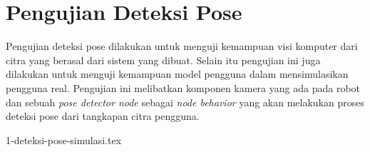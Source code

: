 \section{Pengujian Deteksi Pose}
\label{sec:pengujiandeteksipose}

Pengujian deteksi pose dilakukan untuk menguji kemampuan visi komputer dari citra yang berasal dari sistem yang dibuat.
Selain itu pengujian ini juga dilakukan untuk menguji kemampuan model pengguna dalam mensimulasikan pengguna real.
Pengujian ini melibatkan komponen kamera yang ada pada robot dan sebuah \emph{pose detector node} sebagai \emph{node behavior} yang akan melakukan proses deteksi pose dari tangkapan citra pengguna.

{1-deteksi-pose-simulasi.tex}
